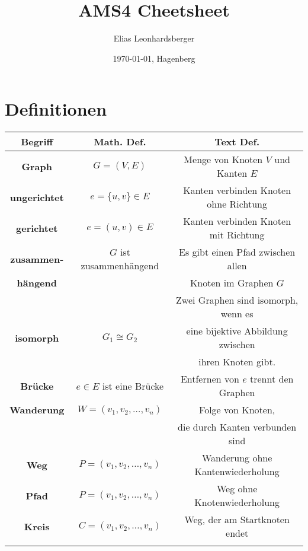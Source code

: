 \documentclass[12pt]{scrartcl}
\title{AMS4 Cheetsheet}
\author{Elias Leonhardsberger}
\date{\today{}, Hagenberg}
\begin{document}
\section{Definitionen}
\begin{tabular}{ c | c | c }
    \textbf{Begriff}      & \textbf{Math. Def.}             & \textbf{Text Def.}                     \\
    \hline
    \textbf{Graph}        & $G = (V, E)$                    & Menge von Knoten $V$ und Kanten $E$    \\
    \hline
    \textbf{ungerichtet}  & $e = \{u, v\} \in E$            & Kanten verbinden Knoten ohne Richtung  \\
    \hline
    \textbf{gerichtet}    & $e = (u, v) \in E$              & Kanten verbinden Knoten mit Richtung   \\
    \hline
    \textbf{zusammen-}    & $G$ ist zusammenhängend         & Es gibt einen Pfad zwischen allen      \\
    \textbf{hängend}      &                                 & Knoten im Graphen $G$                  \\
    \hline
                          &                                 & Zwei Graphen sind isomorph, wenn es    \\
    \textbf{isomorph}     & $G_1 \cong G_2$                 & eine bijektive Abbildung zwischen      \\
                          &                                 & ihren Knoten gibt.                     \\
    \textbf{Brücke}       & $e \in E$ ist eine Brücke       & Entfernen von $e$ trennt den Graphen   \\
    \hline
    \textbf{Wanderung}    & $W = (v_1, v_2, \ldots, v_n)$   & Folge von Knoten,                      \\
                          &                                 & die durch Kanten verbunden sind        \\
    \hline
    \textbf{Weg}          & $P = (v_1, v_2, \ldots, v_n)$   & Wanderung ohne Kantenwiederholung      \\
    \hline
    \textbf{Pfad}         & $P = (v_1, v_2, \ldots, v_n)$   & Weg ohne Knotenwiederholung            \\
    \hline
    \textbf{Kreis}        & $C = (v_1, v_2, \ldots, v_n)$   & Weg, der am Startknoten endet          \\
                          &                                 &                                        \\

\end{tabular}
\end{document}
